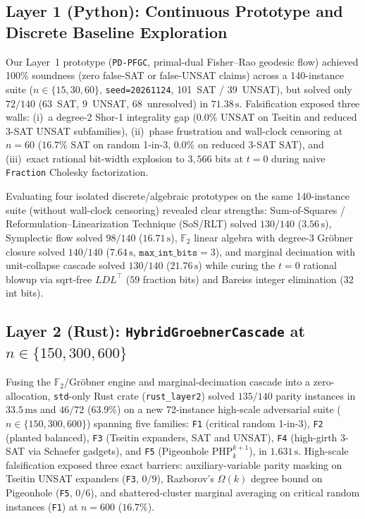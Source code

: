 \documentclass[11pt]{article}
\begin{document}
\subsection{Layer 1 (Python): Continuous Prototype and Discrete Baseline Exploration}
Our Layer~1 prototype (\texttt{PD-PFGC}, primal-dual Fisher--Rao geodesic flow) achieved 100\% soundness (zero false-SAT or false-UNSAT claims) across a 140-instance suite ($n \in \{15, 30, 60\}$, \texttt{seed=20261124}, 101~SAT / 39~UNSAT), but solved only $72/140$ ($63$~SAT, $9$~UNSAT, $68$~unresolved) in $71.38\,\text{s}$. Falsification exposed three walls: (i)~a degree-2 Shor-1 integrality gap ($0.0\%$ UNSAT on Tseitin and reduced 3-SAT UNSAT subfamilies), (ii)~phase frustration and wall-clock censoring at $n = 60$ ($16.7\%$ SAT on random 1-in-3, $0.0\%$ on reduced 3-SAT SAT), and (iii)~exact rational bit-width explosion to $3{,}566$ bits at $t = 0$ during naive \texttt{Fraction} Cholesky factorization.

Evaluating four isolated discrete/algebraic prototypes on the same 140-instance suite (without wall-clock censoring) revealed clear strengths: Sum-of-Squares / Reformulation--Linearization Technique (SoS/RLT) solved $130/140$ ($3.56\,\text{s}$), Symplectic flow solved $98/140$ ($16.71\,\text{s}$), $\mathbb{F}_2$ linear algebra with degree-3 Gr\"obner closure solved \textbf{$140/140$} ($7.64\,\text{s}$, $\texttt{max\_int\_bits} = 3$), and marginal decimation with unit-collapse cascade solved $130/140$ ($21.76\,\text{s}$) while curing the $t=0$ rational blowup via sqrt-free $LDL^\top$ ($59$ fraction bits) and Bareiss integer elimination ($32$ int bits).

\subsection{Layer 2 (Rust): \texttt{HybridGroebnerCascade} at $n \in \{150, 300, 600\}$}
Fusing the $\mathbb{F}_2$/Gr\"obner engine and marginal-decimation cascade into a zero-allocation, \texttt{std}-only Rust crate (\texttt{rust\_layer2}) solved $135/140$ parity instances in $33.5\,\text{ms}$ and $46/72$ ($63.9\%$) on a new 72-instance high-scale adversarial suite ($n \in \{150, 300, 600\}$) spanning five families: \texttt{F1} (critical random 1-in-3), \texttt{F2} (planted balanced), \texttt{F3} (Tseitin expanders, SAT and UNSAT), \texttt{F4} (high-girth 3-SAT via Schaefer gadgets), and \texttt{F5} (Pigeonhole $\mathrm{PHP}_k^{k+1}$), in $1.631\,\text{s}$. High-scale falsification exposed three exact barriers: auxiliary-variable parity masking on Tseitin UNSAT expanders (\texttt{F3}, $0/9$), Razborov's $\Omega(k)$ degree bound on Pigeonhole (\texttt{F5}, $0/6$), and shattered-cluster marginal averaging on critical random instances (\texttt{F1}) at $n=600$ ($16.7\%$).
\end{document}
